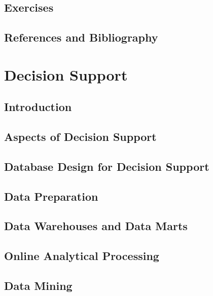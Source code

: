 \documentclass{book}
\begin{document}
\section{Exercises}

\section{References and Bibliography}















\chapter{Decision Support}

\section{Introduction}

\section{Aspects of Decision Support}

\section{Database Design for Decision Support}

\section{Data Preparation}

\section{Data Warehouses and Data Marts}

\section{Online Analytical Processing}

\section{Data Mining}
\end{document}
